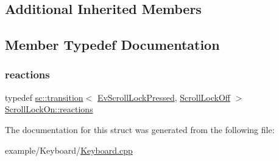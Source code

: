 \subsection*{Additional Inherited Members}


\subsection{Member Typedef Documentation}
\mbox{\label{struct_scroll_lock_on_a20a7579e66e108f81666db1566e38faa}} 
\subsubsection{\texorpdfstring{reactions}{reactions}}
{\footnotesize\ttfamily typedef \mbox{\hyperlink{classboost_1_1statechart_1_1transition}{sc\+::transition}}$<$ \mbox{\hyperlink{struct_ev_scroll_lock_pressed}{Ev\+Scroll\+Lock\+Pressed}}, \mbox{\hyperlink{struct_scroll_lock_off}{Scroll\+Lock\+Off}} $>$ \mbox{\hyperlink{struct_scroll_lock_on_a20a7579e66e108f81666db1566e38faa}{Scroll\+Lock\+On\+::reactions}}}



The documentation for this struct was generated from the following file\+:\begin{DoxyCompactItemize}
\item 
example/\+Keyboard/\mbox{\hyperlink{_keyboard_8cpp}{Keyboard.\+cpp}}\end{DoxyCompactItemize}
